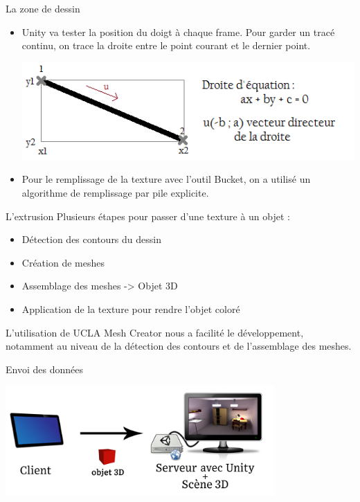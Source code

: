 \documentclass[a4paper,10pt]{beamer}
\begin{document}
	\begin{frame}{La zone de dessin}
		\begin{itemize}
		\item Unity va tester la position du doigt à chaque frame.
		Pour garder un tracé continu, on trace la droite entre le point courant et le dernier point.
		\centerline{\includegraphics[scale=0.4]{images/intro/trait.png}}
		
		\item Pour le remplissage de la texture avec l'outil Bucket, on a utilisé un algorithme de remplissage par pile explicite.
	\end{itemize}
	\end{frame}
	
	\begin{frame}{L'extrusion}
		Plusieurs étapes pour passer d'une texture à un objet :
		\begin{itemize}
			\item Détection des contours du dessin
			\item Création de meshes
			\item Assemblage des meshes -> Objet 3D
			\item Application de la texture pour rendre l'objet coloré
		\end{itemize}
		
		L'utilisation de UCLA Mesh Creator nous a facilité le développement, notamment au niveau de la détection des contours et de l'assemblage des meshes.
	\end{frame}
		
	
	\begin{frame}{Envoi des données}
		\centerline{\includegraphics[height=120pt]{images/network/sending_model2.png}}
	\end{frame}
	
\end{document}
